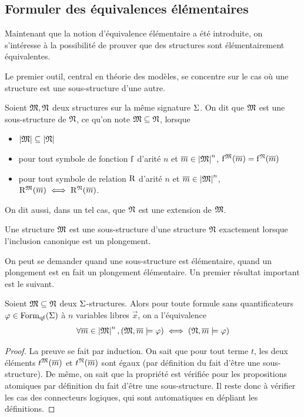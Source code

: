 \subsection{Formuler des équivalences élémentaires}

Maintenant que la notion d'équivalence élémentaire a été introduite, on
s'intéresse à la possibilité de prouver que des structures sont élémentairement
équivalentes.

Le premier outil, central en théorie des modèles, se concentre sur le cas où
une structure est une sous-structure d'une autre.

\begin{definition}
  Soient $\mathfrak{M},\mathfrak{N}$ deux structures sur la même signature $\Sigma$. On dit
  que $\mathfrak{M}$ est une sous-structure de $\mathfrak{N}$, ce qu'on note
  $\mathfrak{M}\subseteq\mathfrak{N}$, lorsque
  \begin{itemize}
  \item $\left\vert \mathfrak{M}\right\vert\subseteq\left\vert \mathfrak{N}\right\vert$
  \item pour tout symbole de fonction $\mathrm{f}$ d'arité $n$ et
    $\overline{m} \in \left\vert \mathfrak{M}\right\vert^n$, $\mathrm{f}^{\mathfrak{M}}(\overline{m}) = \mathrm{f}^{\mathfrak{N}}(\overline{m})$
  \item pour tout symbole de relation $\mathrm{R}$ d'arité $n$ et
    $\overline{m} \in \left\vert \mathfrak{M}\right\vert^n$, $\mathrm{R}^{\mathfrak{M}}(\overline{m}) \iff \mathrm{R}^{\mathfrak{N}}(\overline{m})$.
  \end{itemize}
  On dit aussi, dans un tel cas, que $\mathfrak{N}$ est une extension de
  $\mathfrak{M}$.
\end{definition}

\begin{remark}
  Une structure $\mathfrak{M}$ est une sous-structure d'une structure $\mathfrak{N}$
  exactement lorsque l'inclusion canonique est un plongement.
\end{remark}

On peut se demander quand une sous-structure est élémentaire, 
quand un plongement est en fait un plongement élémentaire. Un premier résultat
important est le suivant.

\begin{proposition}
  Soient $\mathfrak{M}\subseteq\mathfrak{N}$ deux $\Sigma$-structures. Alors pour toute
  formule sans quantificateurs $\varphi\in\operatorname{Form}_{\mathrm{qf}}(\Sigma)$ à $n$ variables libres
  $\vec x$, on a l'équivalence
  \[\forall \overline{m} \in \left\vert \mathfrak{M}\right\vert^n, (\mathfrak{M},\overline{m}\models\varphi)\iff
  (\mathfrak{N},\overline{m}\models\varphi)\]
\end{proposition}

\begin{proof}
  La preuve se fait par induction. On sait que pour tout terme $t$, les deux
  éléments $t^{\mathfrak{M}}(\overline{m})$ et $t^{\mathfrak{N}}(\overline{m})$ sont égaux (par définition
  du fait d'être une sous-structure). De même, on sait que la propriété
  est vérifiée pour les propositions atomiques par définition du fait d'être une
  sous-structure. Il reste donc à vérifier les cas des connecteurs logiques,
  qui sont automatiques en dépliant les définitions.
\end{proof}

